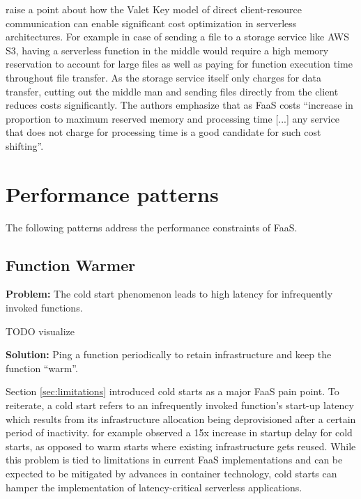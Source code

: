 \textcite{adzic2017serverless} raise a point about how the Valet Key model of direct client-resource communication can enable significant cost optimization in serverless architectures. For example in case of sending a file to a storage service like AWS S3, having a serverless function in the middle would require a high memory reservation to account for large files as well as paying for function execution time throughout file transfer. As the storage service itself only charges for data transfer, cutting out the middle man and sending files directly from the client reduces costs significantly. The authors emphasize that as FaaS costs ``increase in proportion to maximum reserved memory and processing time [...] any service that does not charge for processing time is a good candidate for such cost shifting''.



\section{Performance patterns} \label{sec:perfPatterns}

The following patterns address the performance constraints of FaaS.

\subsection{Function Warmer} \label{subsec:FunctionWarmer}

\textbf{Problem:} The cold start phenomenon leads to high latency for infrequently invoked functions.

TODO visualize

\textbf{Solution:} Ping a function periodically to retain infrastructure and keep the function ``warm''.

Section \ref{sec:limitations} introduced cold starts as a major FaaS pain point. To reiterate, a cold start refers to an infrequently invoked function's start-up latency which results from its infrastructure allocation being deprovisioned after a certain period of inactivity. \textcite{lloydserverless} for example observed a 15x increase in startup delay for cold starts, as opposed to warm starts where existing infrastructure gets reused. While this problem is tied to limitations in current FaaS implementations and can be expected to be mitigated by advances in container technology, cold starts can hamper the implementation of latency-critical serverless applications.

